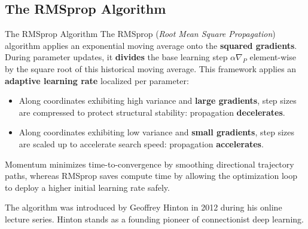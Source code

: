 \subsection[The RMSprop Algorithm]{The RMSprop Algorithm}

\begin{frame}{The RMSprop Algorithm}
	The RMSprop (\textit{Root Mean Square Propagation}) algorithm applies an exponential moving average onto the \textbf{squared gradients}. During parameter updates, it \textbf{divides} the base learning step $\alpha \nabla_P$ element-wise by the square root of this historical moving average. This framework applies an \textbf{adaptive learning rate} localized per parameter:
	\pause
	\begin{itemize}
		\item Along coordinates exhibiting high variance and \textbf{large gradients}, step sizes are compressed to protect structural stability: propagation \textbf{decelerates}.
		\item Along coordinates exhibiting low variance and \textbf{small gradients}, step sizes are scaled up to accelerate search speed: propagation \textbf{accelerates}.
	\end{itemize}
	\pause
	Momentum minimizes time-to-convergence by smoothing directional trajectory paths, whereas RMSprop saves compute time by allowing the optimization loop to deploy a higher initial learning rate safely.
	
	\vspace{0.3cm}
	\pause
	The algorithm was introduced by Geoffrey Hinton in 2012 during his online lecture series. Hinton stands as a founding pioneer of connectionist deep learning.
\end{frame}

